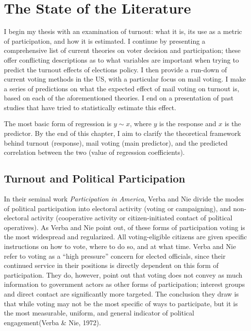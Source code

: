 \documentclass[12pt,twoside]{reedthesis}
\begin{document}
  \chapter{The State of the Literature}\label{rmd-basics}
  
  I begin my thesis with an examination of turnout: what it is, its use as
  a metric of participation, and how it is estimated. I continue by
  presenting a comprehensive list of current theories on voter decision
  and participation; these offer conflicting descriptions as to what
  variables are important when trying to predict the turnout effects of
  elections policy. I then provide a run-down of current voting methods in
  the US, with a particular focus on mail voting. I make a series of
  predictions on what the expected effect of mail voting on turnout is,
  based on each of the aforementioned theories. I end on a presentation of
  past studies that have tried to statistically estimate this effect.
  
  The most basic form of regression is \(y\sim x\), where \(y\) is the
  response and \(x\) is the predictor. By the end of this chapter, I aim
  to clarify the theoretical framework behind turnout (response), mail
  voting (main predictor), and the predicted correlation between the two
  (value of regression coefficients).
  
  \section{Turnout and Political
  Participation}\label{turnout-and-political-participation}
  
  In their seminal work \emph{Participation in America}, Verba and Nie
  divide the modes of political participation into electoral activity
  (voting or campaigning), and non-electoral activity (cooperative
  activity or citizen-initiated contact of political operatives). As Verba
  and Nie point out, of these forms of participation voting is the most
  widespread and regularized. All voting-eligible citizens are given
  specific instructions on how to vote, where to do so, and at what time.
  Verba and Nie refer to voting as a ``high pressure'' concern for elected
  officials, since their continued service in their positions is directly
  dependent on this form of participation. They do, however, point out
  that voting does not convey as much information to government actors as
  other forms of participation; interest groups and direct contact are
  significantly more targeted. The conclusion they draw is that while
  voting may not be the most specific of ways to participate, but it is
  the most measurable, uniform, and general indicator of political
  engagement(Verba \& Nie, 1972).
  
\end{document}
